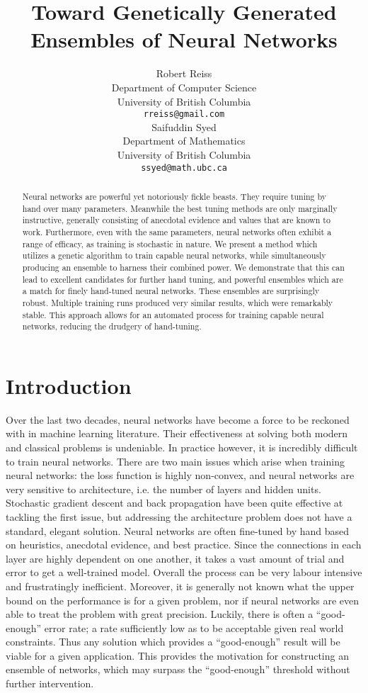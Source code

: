 \documentclass{article}
\title{Toward Genetically Generated Ensembles of Neural Networks}
\author{
  Robert Reiss%
\\
  Department of Computer Science\\
  University of British Columbia\\
  \texttt{rreiss@gmail.com} \\
  \And
  Saifuddin Syed \\
  Department of Mathematics \\
  University of British Columbia\\
  \texttt{ssyed@math.ubc.ca} \\
}
\DeclareMathOperator{\1}{\mathbbm{1}}
\begin{document}

\maketitle

\begin{abstract}
Neural networks are powerful yet notoriously fickle beasts. They require tuning by hand over many parameters. Meanwhile the best tuning
methods are only marginally instructive, generally consisting of anecdotal evidence and values that are known to work. 
Furthermore, even with the same parameters, neural networks often exhibit a range of efficacy, as training is stochastic in nature. We
present a method which utilizes a genetic algorithm to train capable neural networks, while simultaneously producing an ensemble to harness their combined
power. We demonstrate that this can lead to excellent candidates for further hand tuning, and powerful ensembles which are a match for
finely hand-tuned neural networks. These ensembles are surprisingly robust. Multiple training runs produced very similar results,
which were remarkably stable. This approach allows for an automated process for training capable neural networks, reducing
the drudgery of hand-tuning.
\end{abstract}

\section{Introduction}
Over the last two decades, neural networks have become a force to be reckoned with in machine learning literature.
Their effectiveness at solving both modern and classical problems is undeniable. 
In practice however, it is incredibly difficult to train neural networks. 
There are two main issues which arise when training neural networks: the loss function is highly non-convex,
and neural networks are very sensitive to architecture, i.e. the number of layers and hidden units.
Stochastic gradient descent and back propagation have been quite effective at tackling the first issue, 
but addressing the architecture problem does not have a standard, elegant solution. Neural networks are often fine-tuned by hand
based on heuristics, anecdotal evidence, and best practice. Since the connections in each layer are highly dependent on one another,
it takes a vast amount of trial and error to get a well-trained model. Overall the process can be very labour intensive 
and frustratingly inefficient. Moreover, it is generally not known what the upper bound on the performance is for a given
problem, nor if neural networks are even able to treat the problem with great precision. Luckily, there is often
a ``good-enough'' error rate; a rate sufficiently low as to be acceptable given real world constraints. Thus any solution
which provides a ``good-enough'' result will be viable for a given application. This provides the motivation for constructing an 
ensemble of networks, which may surpass the ``good-enough'' threshold without further intervention.
\end{document}
